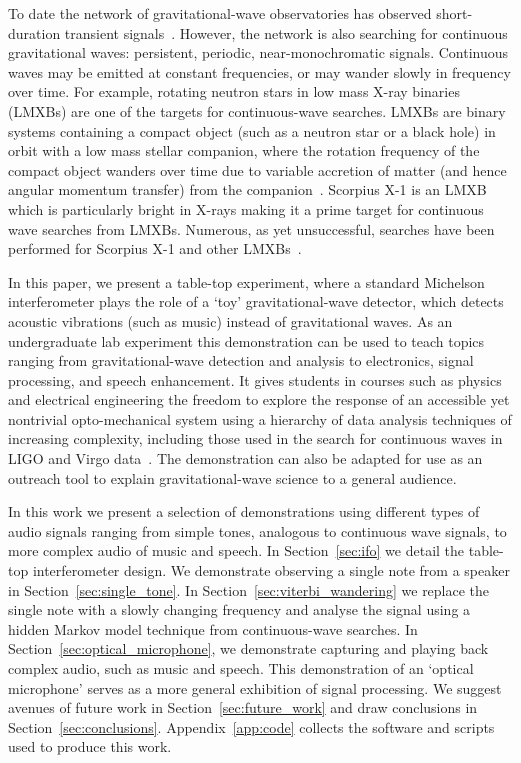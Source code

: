 \documentclass[paper-main.tex]{subfiles}
\begin{document}
To date the network of gravitational-wave observatories has observed short-duration transient signals~\cite{GWTC-1:2018,GWOSC:online}. 
However, the network is also searching for continuous gravitational waves: persistent, periodic, near-monochromatic signals.
Continuous waves may be emitted at constant frequencies, or may wander slowly in frequency over time. 
For example, rotating neutron stars in low mass X-ray binaries (LMXBs) are one of the targets for continuous-wave searches. 
LMXBs are binary systems containing a compact object (such as a neutron star or a black hole) in orbit with a low mass stellar companion, where the rotation frequency of the compact object wanders over time due to variable accretion of matter (and hence angular momentum transfer) from the companion~\cite{xraybinaries:1997}. 
Scorpius X-1 is an LMXB which is particularly bright in X-rays making it a prime target for continuous wave searches from LMXBs. 
Numerous, as yet unsuccessful, searches have been performed for Scorpius X-1 and other LMXBs~\cite{ScoX1O2Viterbi:2019,RadiometerO1O2:2019,SearchCrossCorrO1:2017,ScoX1ViterbiO1:2017,SearchRadiometerO1:2017,SearchCrossCorrO1:2017,MiddletonEtAlO2LMXBs:2020,SearchTwoSpecS6:2017}.


In this paper, we present a table-top experiment, where a standard Michelson interferometer plays the role of a `toy' gravitational-wave detector, which detects acoustic vibrations (such as music) instead of gravitational waves. 
As an undergraduate lab experiment this demonstration can be used to teach topics ranging from gravitational-wave detection and analysis to electronics, signal processing, and speech enhancement. 
It gives students in courses such as physics and electrical engineering the freedom to explore the response of an accessible yet nontrivial opto-mechanical system using a hierarchy of data analysis techniques of increasing complexity, including those used in the search for continuous waves in LIGO and Virgo data~\cite{ScoX1O2Viterbi:2019,ScoX1ViterbiO1:2017,SuvorovaEtAl:2017,SuvorovaEtAl:2017}.
The demonstration can also be adapted for use as an outreach tool to explain gravitational-wave science to a general audience. 


In this work we present a selection of demonstrations using different types of audio signals ranging from simple tones, analogous to continuous wave signals, to more complex audio of music and speech. 
In Section~\ref{sec:ifo} we detail the table-top interferometer design. 
We demonstrate observing a single note from a speaker in Section~\ref{sec:single_tone}.
In Section~\ref{sec:viterbi_wandering} we replace the single note with a slowly changing frequency and analyse the signal using a hidden Markov model technique from continuous-wave searches. 
In Section~\ref{sec:optical_microphone}, we demonstrate capturing and playing back complex audio, such as music and speech. 
This demonstration of an `optical microphone' serves as a more general exhibition of signal processing. 
We suggest avenues of future work in Section~\ref{sec:future_work} and draw conclusions in Section~\ref{sec:conclusions}.
Appendix~\ref{app:code} collects the software and scripts used to produce this work. 
\end{document}
